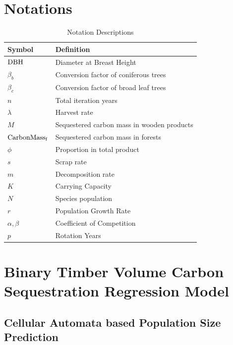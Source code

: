 \documentclass{mcmthesis}
\numberwithin{figure}{section}
\numberwithin{table}{section}
\numberwithin{equation}{section}
\begin{document}
\section{Notations}

\renewcommand\arraystretch{1.5}

\begin{table}[htpb!]
  \centering
  \caption{Notation Descriptions}
  \begin{tabular}{m{2.5cm}<{\centering}|m{12.5cm}<{\centering}}
  \toprule[1.5pt]
  \textbf{Symbol} & \textbf{Definition} \\ \hline
  $ \rm{DBH} $ & Diameter at Breast Height \\
  $ \beta_b $ & Conversion factor of coniferous trees\\
  $\beta_c$ & Conversion factor of broad leaf trees\\
  $ n $ & Total iteration years\\
  $ \lambda $ & Harvest rate\\
  $ M $ & Sequestered carbon mass in wooden products \\
  $ \rm{CarbonMass_f} $ & Sequestered carbon mass in forests \\
  $ \phi $ & Proportion in total product\\
  $ s $ & Scrap rate\\
  $ m $ & Decomposition rate \\
  $ K $ & Carrying Capacity \\
  $ N $ & Species population \\
  $ r $ & Population Growth Rate\\
  $ \alpha,\beta $ & Coefficient of Competition\\
  $ p $ & Rotation Years \\
  

  \bottomrule[1.5pt]
  \end{tabular}
\end{table}

\newpage

\section{Binary Timber Volume Carbon Sequestration Regression Model}
\subsection{Cellular Automata based Population Size Prediction}
\end{document}
